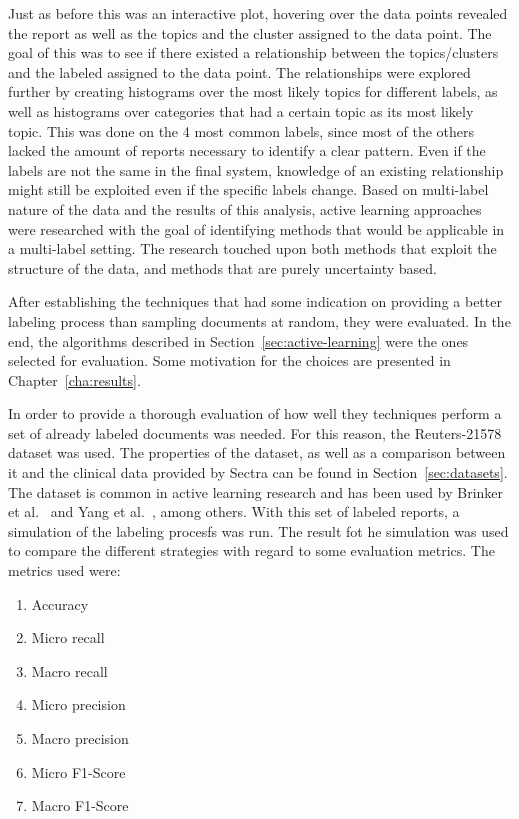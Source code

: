 Just as before this was an interactive plot, hovering over the data points revealed the report as well as the topics and the cluster assigned to the data point.
The goal of this was to see if there existed a relationship between the topics/clusters and the labeled assigned to the data point.
The relationships were explored further by creating histograms over the most likely topics for different labels, as well as histograms over categories that had a certain topic as its most likely topic.
This was done on the 4 most common labels, since most of the others lacked the amount of reports necessary to identify a clear pattern.
Even if the labels are not the same in the final system, knowledge of an existing relationship might still be exploited even if the specific labels change.
Based on multi-label nature of the data and the results of this analysis, active learning approaches were researched with the goal of identifying methods that would be applicable in a multi-label setting.
The research touched upon both methods that exploit the structure of the data, and methods that are purely uncertainty based.

After establishing the techniques that had some indication on providing a better labeling process than sampling documents at random, they were evaluated.
In the end, the algorithms described in Section~\ref{sec:active-learning} were the ones selected for evaluation.
Some motivation for the choices are presented in Chapter~\ref{cha:results}.

In order to provide a thorough evaluation of how well they techniques perform a set of already labeled documents was needed.
For this reason, the Reuters-21578 dataset was used.
The properties of the dataset, as well as a comparison between it and the clinical data provided by Sectra can be found in Section~\ref{sec:datasets}.
The dataset is common in active learning research and has been used by Brinker et al\@.~\cite{brinker2006active} and Yang et al\@.~\cite{yang2009effective}, among others.
With this set of labeled reports, a simulation of the labeling procesfs was run.
The result fot he simulation was used to compare the different strategies with regard to some evaluation metrics.
The metrics used were:
\begin{enumerate}
    \item Accuracy
    \item Micro recall
    \item Macro recall
    \item Micro precision
    \item Macro precision
    \item Micro F1-Score
    \item Macro F1-Score
\end{enumerate}

